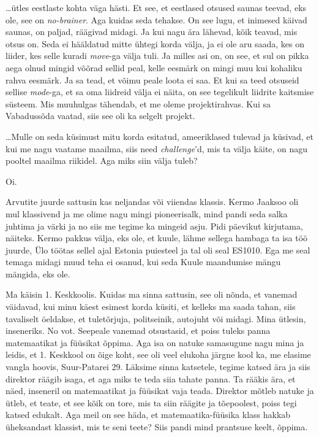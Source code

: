 
\ldots ütles eestlaste kohta väga hästi. Et see, et eestlased otsused saunas teevad, eks ole, see on \emph{no-brainer}. Aga kuidas seda tehakse. On see lugu, et  inimesed käivad saunas, on paljad, räägivad midagi. Ja  kui nagu ära lähevad, kõik teavad, mis otsus on. Seda ei hääldatud mitte ühtegi korda välja, ja ei ole aru saada, kes on liider, kes selle kuradi \emph{move}-ga välja tuli. Ja milles asi on, on see, et sul on pikka aega olnud mingid võõrad sellid peal, kelle eesmärk on mingi muu kui kohaliku rahva eesmärk. Ja sa tead, et võimu peale loota ei saa. Et kui sa teed otsuseid sellise \emph{mode}-ga, et sa oma liidreid välja ei näita, on see tegelikult liidrite kaitsmise süsteem. Mis muuhulgas tähendab, et me oleme projektirahvas. Kui sa  Vabadussõda vaatad, siis see oli ka selgelt projekt.
                 
\ldots Mulle on seda küsimust mitu korda esitatud, ameeriklased tulevad ja küsivad, et kui me nagu vaatame maailma, siis need \emph{challenge}'d, mis ta välja käite, on nagu pooltel maailma riikidel. Aga miks siin välja tuleb?
                 
                 

Oi.

Arvutite juurde  sattusin kas neljandas või viiendas klassis. Kermo Jaaksoo  oli mul  klassivend ja me olime nagu mingi pioneerisalk, mind pandi seda salka juhtima ja värki ja no siis me tegime ka mingeid asju. Pidi päevikut kirjutama, näiteks. Kermo pakkus välja, eks ole, et kuule, lähme sellega hambaga ta isa töö juurde, Ülo töötas sellel ajal Estonia puiesteel ja tal oli seal ES1010. Ega me seal temaga midagi muud teha ei osanud, kui  seda Kuule maandumise mängu mängida, eks ole. 

Ma käisin 1. Keskkoolis.  Kuidas ma sinna sattusin, see oli  nõnda, et vanemad väidavad, kui minu käest esimest korda küsiti, et kelleks ma saada tahan, siis tavaliselt öeldakse, et  tuletõrjuja, politseinik, autojuht või midagi. Mina ütlesin, inseneriks. No vot. Seepeale vanemad otsustasid, et poiss tuleks panna matemaatikat ja füüsikat õppima. Aga isa on natuke samasugune nagu mina ja leidis, et 1. Keskkool on õige koht, see oli veel elukoha järgne kool ka, me elasime vangla hoovis,  Suur-Patarei 29. Läksime sinna katsetele, tegime katsed ära ja siis direktor räägib isaga, et aga miks te teda siia tahate panna. Ta rääkis ära, et näed, inseneril on matemaatikat ja füüsikat vaja teada. Direktor mõtleb natuke ja ütleb, et teate, et see kõik on tore, mis ta siin räägite ja tõepoolest, poiss tegi katsed edukalt. Aga meil on see häda, et matemaatika-füüsika klass hakkab üheksandast klassist, mis te seni teete? Siis pandi mind prantsuse keelt, õppima.

